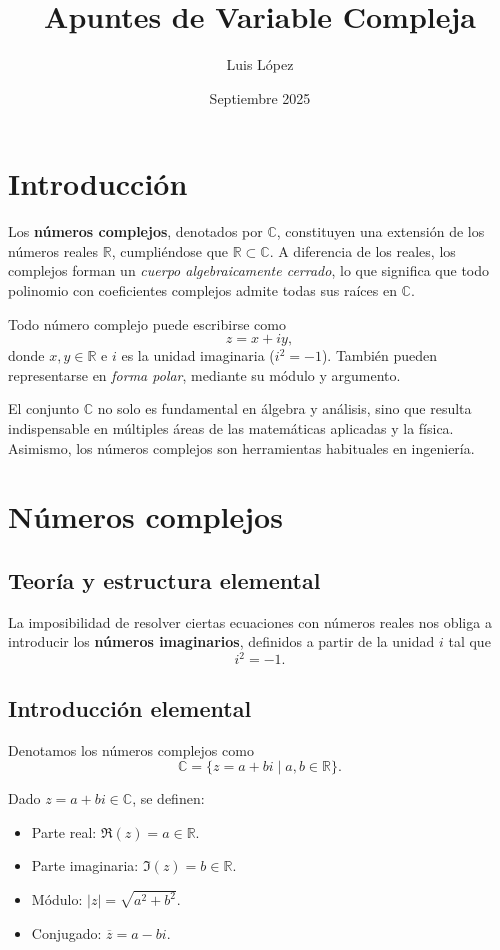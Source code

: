\documentclass[a4paper,12pt]{article}
\title{Apuntes de Variable Compleja}
\author{Luis López}
\date{Septiembre 2025}
\begin{document}
\maketitle
\newpage
\tableofcontents
\newpage

\section*{Introducción}

Los \textbf{números complejos}, denotados por $\mathbb{C}$, constituyen una extensión de los números reales $\mathbb{R}$, cumpliéndose que $\mathbb{R} \subset \mathbb{C}$.
A diferencia de los reales, los complejos forman un \textit{cuerpo algebraicamente cerrado}, lo que significa que todo polinomio con coeficientes complejos admite todas sus raíces en $\mathbb{C}$.

Todo número complejo puede escribirse como
\[
z = x + iy,
\]
donde $x, y \in \mathbb{R}$ e $i$ es la unidad imaginaria ($i^2=-1$).
También pueden representarse en \textit{forma polar}, mediante su módulo y argumento.

El conjunto $\mathbb{C}$ no solo es fundamental en álgebra y análisis, sino que resulta indispensable en múltiples áreas de las matemáticas aplicadas y la física.
Asimismo, los números complejos son herramientas habituales en ingeniería.

\newpage
\section{Números complejos}

\subsection{Teoría y estructura elemental}

La imposibilidad de resolver ciertas ecuaciones con números reales nos obliga a introducir los
\textbf{números imaginarios}, definidos a partir de la unidad $i$ tal que
\[
    i^2 = -1.
\]

\subsection{Introducción elemental}

Denotamos los números complejos como
\[
    \mathbb{C} = \{ z = a + bi \;|\; a,b \in \mathbb{R} \}.
\]

Dado $z = a+bi \in \mathbb{C}$, se definen:
\begin{itemize}
    \item Parte real: $\Re(z) = a \in \mathbb{R}$.
    \item Parte imaginaria: $\Im(z) = b \in \mathbb{R}$.
    \item Módulo: $|z| = \sqrt{a^2+b^2}$.
    \item Conjugado: $\overline{z} = a - bi$.
\end{itemize}
\end{document}
